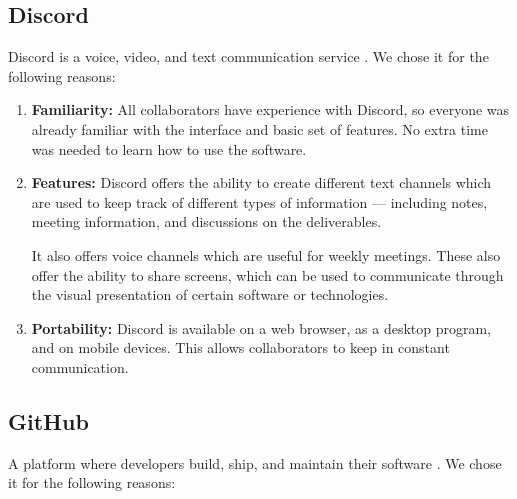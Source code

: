 \documentclass[11pt,onside]{report}
\begin{document}
\subsection{Discord}

Discord is a voice, video, and text communication service \cite{discord}. We chose it for the following reasons:

\begin{enumerate}
    \item \textbf{Familiarity:} All collaborators have experience with Discord, so everyone was already familiar with the interface and basic set of features. No extra time was needed to learn how to use the software.
    
    \item \textbf{Features:} Discord offers the ability to create different text channels which are used to keep track of different types of information — including notes, meeting information, and discussions on the deliverables. 
    
    It also offers voice channels which are useful for weekly meetings. These also offer the ability to share screens, which can be used to communicate through the visual presentation of certain software or technologies.
    
    \item \textbf{Portability:} Discord is available on a web browser, as a desktop program, and on mobile devices. This allows collaborators to keep in constant communication.
\end{enumerate}

\subsection{GitHub} \label{github}

A platform where developers build, ship, and maintain their software \cite{github}. We chose it for the following reasons:
\end{document}

